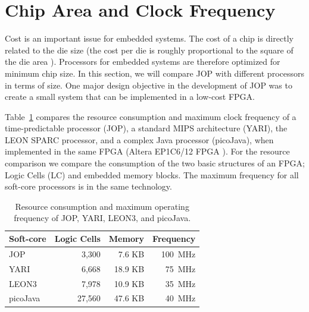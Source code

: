 \section{Chip Area and Clock Frequency}

Cost is an important issue for embedded systems. The cost of a chip
is directly related to the die size (the cost per die is roughly
proportional to the square of the die area \cite{Hennessy02}).
Processors for embedded systems are therefore optimized for minimum
chip size. In this section, we will compare JOP with different
processors in terms of size. One major design objective in the
development of JOP was to create a small system that can be
implemented in a low-cost FPGA.


Table~\ref{tab:soft-cores} compares the resource consumption and
maximum clock frequency of a time-predictable processor (JOP), a
standard MIPS architecture (YARI), the LEON SPARC processor, and a
complex Java processor (picoJava), when implemented in the same FPGA
(Altera EP1C6/12 FPGA \cite{AltCyc}). For the resource comparison we
compare the consumption of the two basic structures of an FPGA; Logic
Cells (LC) and embedded memory blocks. The maximum frequency for all
soft-core processors is in the same technology.

\begin{table}
  \begin{center}
    \begin{tabular}[t]{lrrr}
        \toprule
      Soft-core    & Logic Cells & Memory  & Frequency \\
        \midrule
      JOP          & 3,300       &  7.6 KB & 100~MHz    \\
      YARI         & 6,668       & 18.9 KB & 75~MHz     \\
      LEON3        & 7,978       & 10.9 KB & 35~MHz \\
      picoJava     & 27,560      & 47.6 KB & 40~MHz     \\
        \bottomrule
    \end{tabular}
  \end{center}
    \caption{Resource consumption and maximum operating frequency of JOP, YARI, LEON3, and picoJava.}
    \label{tab:soft-cores}
\end{table}



